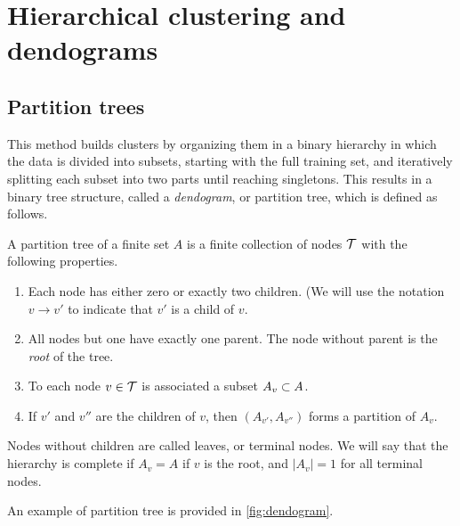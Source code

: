 \section{Hierarchical clustering and dendograms}

\subsection{Partition trees}
This method builds clusters by organizing them in a binary hierarchy in which the data is divided into subsets, starting with the full training set, and iteratively splitting each subset into two parts until reaching singletons. This results in a binary tree structure, called a {\em dendogram}, or partition tree, which is defined as follows.
\begin{definition}
\label{def:dendogram}
A partition tree of a finite set $A$ is a finite collection of nodes ${\mathcal T}$ with the following properties.
\begin{enumerate}[label=(\roman*), wide=.5cm]
\item Each node has either zero  or exactly two children. (We will use the notation $v\to v'$ to indicate that $v'$ is a child of $v$. 
\item All nodes but one have exactly one parent. The node without parent is the {\em root} of the tree.  
\item To each node $v\in{\mathcal T}$ is associated a subset $A_v\subset A$.
\item If $v'$ and $v''$ are the children of $v$, then $(A_{v'}, A_{v''})$ forms a partition of $A_v$.
\end{enumerate}
Nodes without children are called leaves, or  terminal nodes.
We will say that the hierarchy is complete  if $A_v=A$ if $v$ is the root, and  $|A_v|=1$ for all terminal nodes. 
\end{definition}
An example of partition tree is provided in \cref{fig:dendogram}.

